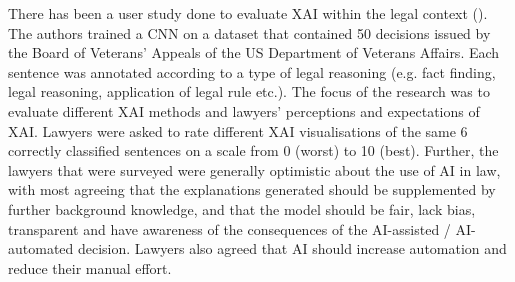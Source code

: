 There has been a user study done to evaluate XAI within the legal context (\cite{gorski2021}). The authors trained a CNN on a dataset that contained 50 decisions issued by the Board of Veterans' Appeals of the US Department of Veterans Affairs. Each sentence was annotated according to a type of legal reasoning (e.g. fact finding, legal reasoning, application of legal rule etc.). The focus of the research was to evaluate different XAI methods and lawyers' perceptions and expectations of XAI. Lawyers were asked to rate different XAI visualisations of the same 6 correctly classified sentences on a scale from 0 (worst) to 10 (best). Further, the lawyers that were surveyed were generally optimistic about the use of AI in law, with most agreeing that the explanations generated should be supplemented by further background knowledge, and that the model should be fair, lack bias, transparent and have awareness of the consequences of the AI-assisted / AI-automated decision. Lawyers also agreed that AI should increase automation and reduce their manual effort.

